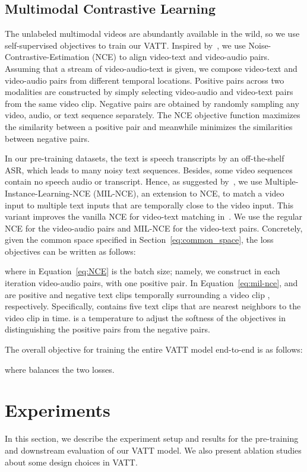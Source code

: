 \documentclass[10pt,twocolumn,letterpaper]{article}
\newcommand{\ours}{VATT\xspace}
\begin{document}
\subsection{Multimodal Contrastive Learning}
The unlabeled multimodal videos are abundantly available in the wild, so we use self-supervised objectives to train our \ours. Inspired by~\cite{mmv,arandjelovic2017look,miech2020end}, we use Noise-Contrastive-Estimation (NCE) to align video-text and video-audio pairs. Assuming that a stream of video-audio-text is given, we compose video-text and video-audio pairs from different temporal locations. Positive pairs across two modalities are constructed by simply selecting video-audio and video-text pairs from the same video clip. Negative pairs are obtained by randomly sampling any video, audio, or text sequence separately. The NCE objective function maximizes the similarity between a positive pair and meanwhile minimizes the similarities between negative pairs. 

In our pre-training datasets, the text is speech transcripts by an off-the-shelf ASR, which leads to many noisy text sequences. Besides, some video sequences contain no speech audio or transcript. Hence, as suggested by~\cite{mmv}, we use Multiple-Instance-Learning-NCE (MIL-NCE), an extension to NCE, to match a video input to multiple text inputs that are temporally close to the video input. This variant improves the vanilla NCE for video-text matching in~\cite{miech2020end}. We use the regular NCE for the video-audio pairs and MIL-NCE for the video-text pairs. Concretely, given the common space specified in Section~\ref{eq:common_space}, the loss objectives can be written as follows:



where  in Equation~\ref{eq:NCE} is the batch size; namely, we construct in each iteration  video-audio pairs, with one positive pair. In Equation~\ref{eq:mil-nce},  and  are positive and negative text clips temporally surrounding a video clip , respectively.  Specifically,  contains five text clips that are nearest neighbors to the video clip in time.  is a temperature to adjust the softness of the objectives in distinguishing the positive pairs from the negative pairs.

The overall objective for training the entire \ours model end-to-end is as follows:

where  balances the two losses.


\section{Experiments}
In this section, we describe the experiment setup and results for the pre-training and downstream evaluation of our \ours model. We also present ablation studies about some design choices in \ours.
\end{document}
